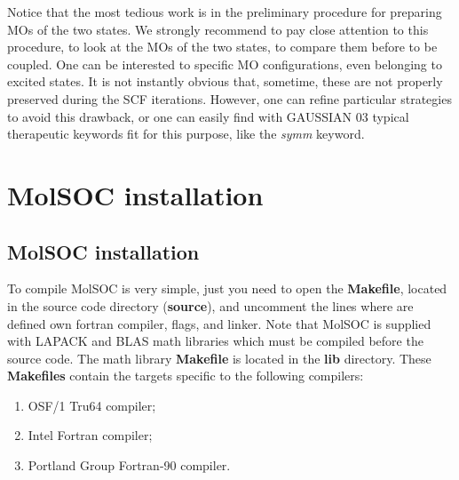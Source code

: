 \documentclass[a4paper,12pt]{article}
\begin{document}
Notice that the most tedious work is in the preliminary procedure for preparing MOs of the two states.
We strongly recommend to pay close attention to this procedure, to look at the MOs of the two states, 
to compare them before to be coupled. 
One can be interested to specific MO configurations, even belonging to excited states. It is not 
instantly obvious that, sometime, these are not properly preserved during the SCF iterations. However, 
one can refine particular strategies to avoid this drawback\cite{Chiod1,Chiod2}, 
or one can easily find with {\sf GAUSSIAN 03} typical therapeutic keywords fit for this purpose, like the 
{\em symm} keyword.

\section{{\sf MolSOC} installation}
\subsection{{\sf MolSOC} installation}
To compile {\sf MolSOC} is very simple, just you need to open the {\bf Makefile}, located in the
source code directory ({\bf source}), and uncomment the lines where are defined 
own fortran compiler, flags, and linker. Note that {\sf MolSOC} is supplied with LAPACK and 
BLAS math libraries which must be compiled before the source code. The math library {\bf Makefile}
is located in the {\bf lib} directory. These {\bf Makefiles} contain the targets specific 
to the following compilers:
\begin{enumerate}
\renewcommand{\labelenumi}{(\roman{enumi})}
\item OSF/1 Tru64 compiler;
\item Intel Fortran compiler;
\item Portland Group Fortran-90 compiler.
\end{enumerate}
\end{document}
